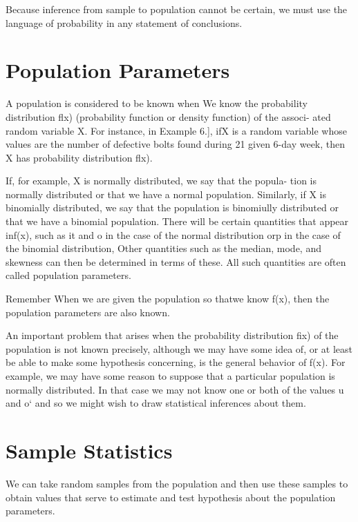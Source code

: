 Because inference from sample to population cannot be certain, we must use the language of probability in any statement of conclusions.
\section{Population Parameters}
A population is considered to be known when We know the probability
distribution ﬂx) (probability function or density function) of the associ-
ated random variable X. For instance, in Example 6.], ifX is a random
variable whose values are the number of defective bolts found during 21
given 6-day week, then X has probability distribution ﬂx).


If, for example, X is normally distributed, we say that the popula-
tion is normally distributed or that we have a normal population. Similarly, if X is binomially distributed, we say that the population is
binomiully distributed or that we have a binomial population. There will be certain quantities that appear inf(x), such as it and o
in the case of the normal distribution orp in the case of the binomial distribution, Other quantities such as the median, mode, and skewness can
then be determined in terms of these. All such quantities are often called
population parameters.

Remember
When we are given the population so thatwe know f(x), then the population parameters are also known.

An important problem that arises when the probability distribution fix) of the population is not known precisely, although we may have some idea of, or at least be able to make some hypothesis concerning,
is the general behavior of f(x). For example, we may have some reason
to suppose that a particular population is normally distributed. In that
case we may not know one or both of the values u and o‘ and so we might wish to draw statistical inferences about them.

\section{Sample Statistics}
We can take random samples from the population and then use these samples to obtain values that serve to estimate and test hypothesis about
the population parameters.

